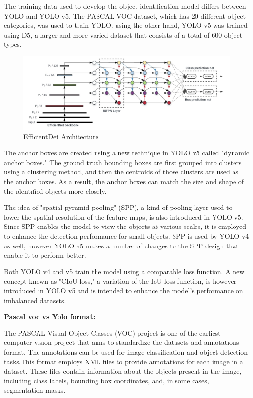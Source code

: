 The training data used to develop the object identification model differs between YOLO and YOLO v5. The PASCAL VOC dataset, which has 20 different object categories, was used to train YOLO. using the other hand, YOLO v5 was trained using D5, a larger and more varied dataset that consists of a total of 600 object types.

\begin{figure}
    \centering
    \includegraphics[scale=.5]{figures/Screenshot 2023-05-19 at 3.17.54 AM.png}
    \caption{EfficientDet Architecture \cite{redmon2016you}}
    \label{fig:my_label}
\end{figure}

The anchor boxes are created using a new technique in YOLO v5 called "dynamic anchor boxes." The ground truth bounding boxes are first grouped into clusters using a clustering method, and then the centroids of those clusters are used as the anchor boxes. As a result, the anchor boxes can match the size and shape of the identified objects more closely.


The idea of "spatial pyramid pooling" (SPP), a kind of pooling layer used to lower the spatial resolution of the feature maps, is also introduced in YOLO v5. Since SPP enables the model to view the objects at various scales, it is employed to enhance the detection performance for small objects. SPP is used by YOLO v4 as well, however YOLO v5 makes a number of changes to the SPP design that enable it to perform better.

Both YOLO v4 and v5 train the model using a comparable loss function. A new concept known as "CIoU loss," a variation of the IoU loss function, is however introduced in YOLO v5 and is intended to enhance the model's performance on imbalanced datasets.

\textbf{Pascal voc vs Yolo format:}

The PASCAL Visual Object Classes (VOC) project is one of the earliest computer vision project that aims to standardize the datasets and annotations format. The annotations can be used for image classification and object detection tasks.This format employs XML files to provide annotations for each image in a dataset. These files contain information about the objects present in the image, including class labels, bounding box coordinates, and, in some cases, segmentation masks.

